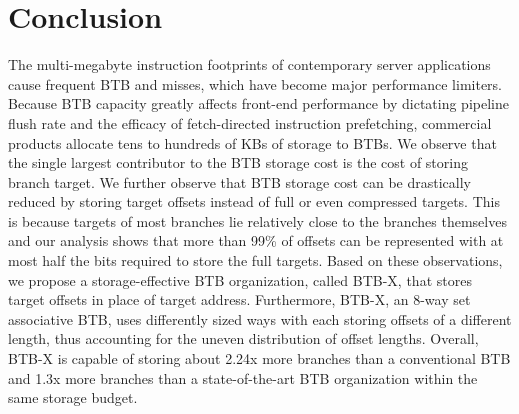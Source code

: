 \section{Conclusion}
\label{hpca:sec:concl}

The multi-megabyte instruction footprints of contemporary server applications cause frequent BTB and  misses, which have become major performance limiters. Because BTB capacity greatly affects front-end performance by dictating pipeline flush rate and the efficacy of fetch-directed instruction prefetching, commercial products allocate tens to hundreds of KBs of storage to BTBs. We observe that the single largest contributor to the BTB storage cost is the cost of storing branch target. We further observe that BTB storage cost can be drastically reduced by storing target offsets instead of full or even compressed targets. This is because targets of most branches lie relatively close to the branches themselves and our analysis shows that more than 99\% of offsets can be represented with at most half the bits required to store the full targets. Based on these observations, we propose a storage-effective BTB organization, called BTB-X, that stores target offsets in place of target address. Furthermore, BTB-X, an 8-way set associative BTB, uses differently sized ways with each storing offsets of a different length, thus accounting for the uneven distribution of offset lengths. Overall, BTB-X is capable of storing about 2.24x more branches than a conventional BTB and 1.3x more branches than a state-of-the-art BTB organization within the same storage budget.